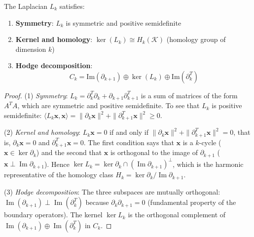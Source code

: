 \begin{theorem}\label{thm:prop_hodge_laplacian}
The Laplacian $L_k$ satisfies:
\begin{enumerate}
    \item \textbf{Symmetry}: $L_k$ is symmetric and positive semidefinite
    \item \textbf{Kernel and homology}: $\ker(L_k) \cong H_k(\mathcal{K})$ (homology group of dimension $k$)
    \item \textbf{Hodge decomposition}:
    \[C_k = \text{Im}(\partial_{k+1}) \oplus \ker(L_k) \oplus \text{Im}(\partial_k^T)\]
\end{enumerate}
\end{theorem}

\begin{proof}
(1) \textit{Symmetry}: $L_k = \partial_k^T \partial_k + \partial_{k+1} \partial_{k+1}^T$ is a sum of matrices of the form $A^T A$, which are symmetric and positive semidefinite. To see that $L_k$ is positive semidefinite: $\langle L_k \mathbf{x}, \mathbf{x} \rangle = \|\partial_k \mathbf{x}\|^2 + \|\partial_{k+1}^T \mathbf{x}\|^2 \geq 0$.

(2) \textit{Kernel and homology}: $L_k \mathbf{x} = 0$ if and only if $\|\partial_k \mathbf{x}\|^2 + \|\partial_{k+1}^T \mathbf{x}\|^2 = 0$, that is, $\partial_k \mathbf{x} = 0$ and $\partial_{k+1}^T \mathbf{x} = 0$. The first condition says that $\mathbf{x}$ is a $k$-cycle ($\mathbf{x} \in \ker \partial_k$) and the second that $\mathbf{x}$ is orthogonal to the image of $\partial_{k+1}$ ($\mathbf{x} \perp \operatorname{Im} \partial_{k+1}$). Hence $\ker L_k = \ker \partial_k \cap (\operatorname{Im} \partial_{k+1})^\perp$, which is the harmonic representative of the homology class $H_k = \ker \partial_k / \operatorname{Im} \partial_{k+1}$.

(3) \textit{Hodge decomposition}: The three subspaces are mutually orthogonal: $\operatorname{Im}(\partial_{k+1}) \perp \operatorname{Im}(\partial_k^T)$ because $\partial_k \partial_{k+1} = 0$ (fundamental property of the boundary operators). The kernel $\ker L_k$ is the orthogonal complement of $\operatorname{Im}(\partial_{k+1}) \oplus \operatorname{Im}(\partial_k^T)$ in $C_k$.
\end{proof}

